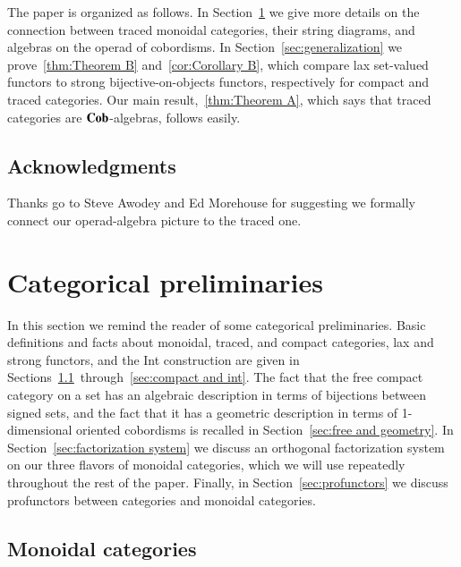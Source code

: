 \documentclass[12pt,oneside,article,draft]{memoir}
\begin{document}
The paper is organized as follows.
In Section~\ref{sec:traced categories} we give more details on the connection between traced monoidal categories, their string diagrams, and algebras on the operad of cobordisms.
In Section~\ref{sec:generalization} we prove~\ref{thm:Theorem B} and~\ref{cor:Corollary B}, which compare lax set-valued functors to strong bijective-on-objects functors, respectively for compact and traced categories.
Our main result,~\ref{thm:Theorem A}, which says that traced categories are $\mathbf{Cob}$-algebras, follows easily.

\section*{Acknowledgments}

Thanks go to Steve Awodey and Ed Morehouse for suggesting we formally connect our operad-algebra picture to the traced one. 


\chapter{Categorical preliminaries}\label{sec:traced categories}

In this section we remind the reader of some categorical preliminaries.
Basic definitions and facts about monoidal, traced, and compact categories, lax and strong functors, and the Int construction are given in Sections~\ref{sec:prelim monoidal}~through~\ref{sec:compact and int}.
The fact that the free compact category on a set has an algebraic description in terms of bijections between signed sets, and the fact that it has a geometric description in terms of 1-dimensional oriented cobordisms is recalled in Section~\ref{sec:free and geometry}.
In Section~\ref{sec:factorization system} we discuss an orthogonal factorization system on our three flavors of monoidal categories, which we will use repeatedly throughout the rest of the paper.
Finally, in Section~\ref{sec:profunctors} we discuss profunctors between categories and monoidal categories.

\section{Monoidal categories}\label{sec:prelim monoidal}
\end{document}
